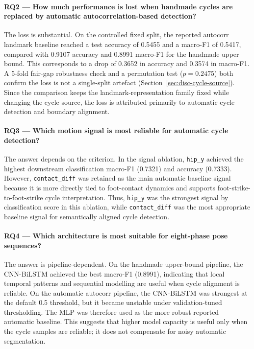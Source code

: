 \paragraph{RQ2 --- How much performance is lost when handmade cycles are
replaced by automatic autocorrelation-based detection?}
The loss is substantial. On the controlled fixed split, the reported autocorr
landmark baseline reached a test accuracy of 0.5455 and a macro-F1 of 0.5417,
compared with 0.9107 accuracy and 0.8991 macro-F1 for the handmade upper
bound. This corresponds to a drop of 0.3652 in accuracy and 0.3574 in
macro-F1. A 5-fold fair-gap robustness check and a permutation test ($p = 0.2475$) both confirm the loss is not a single-split artefact (Section~\ref{sec:disc-cycle-source}). Since the comparison keeps the landmark-representation family fixed while changing the cycle source, the loss is attributed primarily to automatic cycle detection and boundary alignment.

\paragraph{RQ3 --- Which motion signal is most reliable for automatic cycle
detection?}
The answer depends on the criterion. In the signal ablation, \texttt{hip\_y}
achieved the highest downstream classification macro-F1 (0.7321) and accuracy
(0.7333). However, \texttt{contact\_diff} was retained as the main automatic
baseline signal because it is more directly tied to foot-contact dynamics and
supports foot-strike-to-foot-strike cycle interpretation. Thus, \texttt{hip\_y}
was the strongest signal by classification score in this ablation, while
\texttt{contact\_diff} was the most appropriate baseline signal for
semantically aligned cycle detection.

\paragraph{RQ4 --- Which architecture is most suitable for eight-phase pose
sequences?}
The answer is pipeline-dependent. On the handmade upper-bound pipeline, the
CNN-BiLSTM achieved the best macro-F1 (0.8991), indicating that local temporal
patterns and sequential modelling are useful when cycle alignment is reliable.
On the automatic autocorr pipeline, the CNN-BiLSTM was strongest at the default
0.5 threshold, but it became unstable under validation-tuned thresholding. The
MLP was therefore used as the more robust reported automatic baseline. This
suggests that higher model capacity is useful only when the cycle samples are
reliable; it does not compensate for noisy automatic segmentation.

